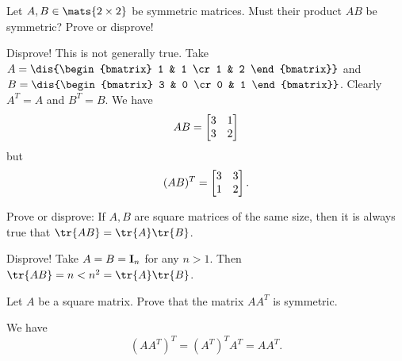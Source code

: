 \begin{requ}
Let $A, B \in \mats{2\times 2}$ be symmetric matrices.
Must their product $AB$ be symmetric? Prove or disprove!
\begin{requanswer}Disprove! This is not generally true. Take $A =
\dis{\begin{bmatrix} 1 & 1 \cr 1 & 2
\end{bmatrix}}$ and $B =
\dis{\begin{bmatrix} 3 & 0 \cr 0 & 1
\end{bmatrix}}$. Clearly $A^T = A$ and $B^T = B$. We have
$$AB  = \begin{bmatrix} 3 & 1 \cr 3 & 2\cr\end{bmatrix}$$but
$$(AB)^T  = \begin{bmatrix} 3 & 3 \cr 1 & 2\cr\end{bmatrix}.$$
\end{requanswer}
\end{requ}

\begin{requ}
Prove or disprove: If $A, B$ are square matrices of the same size,
then it is always true that $\tr{AB} = \tr{A}\tr{B}$.
\begin{requanswer} 
Disprove! Take $A = B = {\bf I}_n$ for any $n>1$. Then $\tr{AB} = n< n^2 = \tr{A}\tr{B}$.  \end{requanswer}
\end{requ}


\begin{requ}
Let $A$ be a square matrix. Prove that the matrix $AA^T$ is
symmetric.
\begin{requanswer} We have
$$(AA^T)^T = (A^T)^TA^T = AA^T.$$
\end{requanswer}
\end{requ}